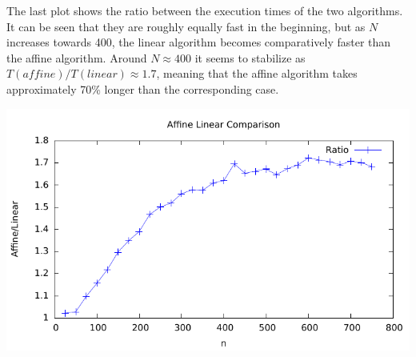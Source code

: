 The last plot shows the ratio between the execution times of the two
algorithms. It can be seen that they are roughly equally fast in the
beginning, but as $N$ increases towards 400, the linear algorithm
becomes comparatively faster than the affine algorithm. Around $N
\approx 400$ it seems to stabilize as $T(affine)/T(linear) \approx
1.7$, meaning that the affine algorithm takes approximately 70\%
longer than the corresponding case.
\begin{center}
	\includegraphics[width=\textwidth]{../plots/plot3.pdf}
\end{center}
